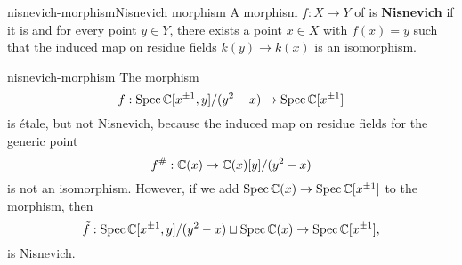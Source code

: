 \begin{topic}{nisnevich-morphism}{Nisnevich morphism}
    A morphism $f : X \to Y$ of  is \textbf{Nisnevich} if it is  and for every point $y \in Y$, there exists a point $x \in X$ with $f(x) = y$ such that the induced map on residue fields $k(y) \to k(x)$ is an isomorphism.
\end{topic}

\begin{example}{nisnevich-morphism}
    The morphism
    \[ f : \operatorname{Spec} \mathbb{C}[x^{\pm 1}, y] / (y^2 - x) \to \operatorname{Spec} \mathbb{C}[x^{\pm 1}] \]
    is étale, but not Nisnevich, because the induced map on residue fields for the generic point
    \[ f^\# : \mathbb{C}(x) \to \mathbb{C}(x)[y] / (y^2 - x) \]
    is not an isomorphism. However, if we add $\operatorname{Spec} \mathbb{C}(x) \to \operatorname{Spec} \mathbb{C}[x^{\pm 1}]$ to the morphism, then
    \[ \tilde{f} : \operatorname{Spec} \mathbb{C}[x^{\pm 1}, y] / (y^2 - x) \sqcup \operatorname{Spec} \mathbb{C}(x) \to \operatorname{Spec} \mathbb{C}[x^{\pm 1}] , \]
    is Nisnevich.
\end{example}
